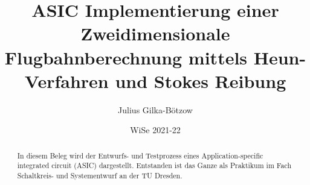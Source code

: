 \documentclass{artilcle}
\title{ASIC Implementierung einer Zweidimensionale Flugbahnberechnung mittels Heun-Verfahren und Stokes Reibung}
\author{Julius Gilka-Bötzow}
\date{WiSe 2021-22}
\begin{document}
    \begin{titlepage}
        \maketitle
    \end{titlepage}

    \begin{abstract}
        In diesem Beleg wird der Entwurfs- und Testprozess eines Application-specific integrated circuit (ASIC)
        dargestellt. Entstanden ist das Ganze als Praktikum im Fach Schaltkreis- und Systementwurf an der TU Dresden.
    \end{abstract}

\end{document}

